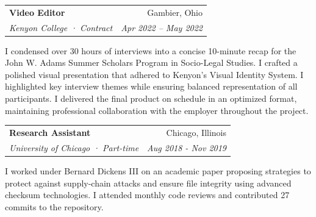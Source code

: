 \documentclass[letterpaper,10pt]{article}
\makeatletter
\newcommand{\resumeSubheading}[4]{
	\vspace{-2pt}\item
	\begin{tabular*}{0.97\textwidth}[t]{l@{\extracolsep{\fill}}r}
		\textbf{#1} & #2 \\
		\textit{\small#3} & \textit{\small #4} \\
	\end{tabular*}\vspace{-7pt}
}
\newcommand{\resumeParagraph}[1]{
	\item[]
	\parbox{\linewidth}{
		\small{#1\xspace} %
	}
	\vspace{-7pt}
}
\makeatother
\begin{document}
\resumeSubheading
{Video Editor}{Gambier, Ohio}
{Kenyon College · Contract}{Apr 2022 – May 2022}
\resumeParagraph{I condensed over 30 hours of interviews into a concise 10-minute recap for the John W. Adams Summer Scholars Program in Socio-Legal Studies. I crafted a polished visual presentation that adhered to Kenyon’s Visual Identity System. I highlighted key interview themes while ensuring balanced representation of all participants. I delivered the final product on schedule in an optimized format, maintaining professional collaboration with the employer throughout the project.}

\vspace{2pt}

\resumeSubheading
{Research Assistant}{Chicago, Illinois}
{University of Chicago · Part-time}{Aug 2018 - Nov 2019}
\resumeParagraph{I worked under Bernard Dickens III on an academic paper proposing strategies to protect against supply-chain attacks and ensure file integrity using advanced checksum technologies. I attended monthly code reviews and contributed 27 commits to the repository.}

\end{document}
